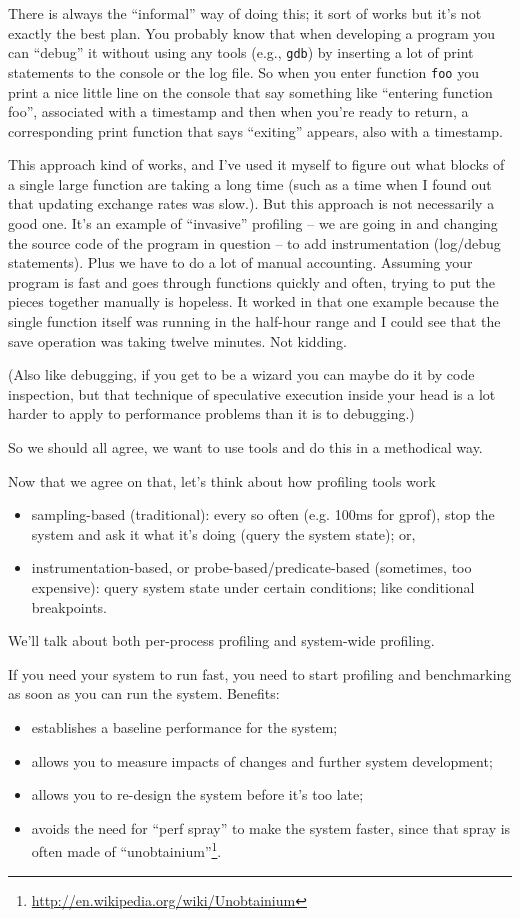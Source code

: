 There is always the ``informal'' way of doing this; it sort of works but it's not exactly the best plan. You probably know that when developing a program you can ``debug'' it without using any tools (e.g., \texttt{gdb}) by inserting a lot of print statements to the console or the log file. So when you enter function \texttt{foo} you print a nice little line on the console that say something like ``entering function foo'', associated with a timestamp and then when you're ready to return, a corresponding print function that says ``exiting'' appears, also with a timestamp.

This approach kind of works, and I've used it myself to figure out what blocks of a single large function are taking a long time (such as a time when I found out that updating exchange rates was slow.). But this approach is not necessarily a good one.  It's an example of ``invasive'' profiling -- we are going in and changing the source code of the program in question -- to add instrumentation (log/debug statements). Plus we have to do a lot of manual accounting. Assuming your program is fast and goes through functions quickly and often, trying to put the pieces together manually is hopeless. It worked in that one example because the single function itself was running in the half-hour range and I could see that the save operation was taking twelve minutes. Not kidding. 

(Also like debugging, if you get to be a wizard you can maybe do it by code inspection, but that technique of speculative execution inside your head is a lot harder to apply to performance problems than it is to debugging.)

So we should all agree, we want to use tools and do this in a methodical way.

Now that we agree on that, let's think about how profiling tools work\:

\begin{itemize}
\item sampling-based (traditional): every so often (e.g. 100ms for gprof), stop the system and ask it what it's doing (query the system state); or,
\item instrumentation-based, or probe-based/predicate-based
  (sometimes, too expensive): query system state under certain
  conditions; like conditional breakpoints.
\end{itemize}
We'll talk about both per-process profiling and system-wide profiling.

If you need your system to run fast, you need to start profiling
and benchmarking as soon as you can run the system. Benefits:
\begin{itemize}
\item establishes a baseline performance for the system;
\item allows you to measure impacts of changes and further system development;
\item allows you to re-design the system before it's too late;
\item avoids the need for ``perf spray'' to make the system faster, since
that spray is often made of ``unobtainium''\footnote{\url{http://en.wikipedia.org/wiki/Unobtainium}}.
\end{itemize}


